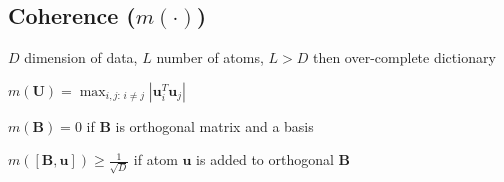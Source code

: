 \documentclass[a4paper, 11pt, landscape]{article}
\DeclareMathOperator*{\argmax}{arg\,max}
\begin{document}
\begin{multicols*}{3}


\section{Coherence ($m(\cdot)$)}
\begin{compactitem}
	\item $D$ dimension of data, $L$ number of atoms, $L > D$ then over-complete dictionary
	\item $m(\mathbf{U}) = \max_{i,j:\, i \neq j} | \mathbf{u}_i^T \mathbf{u}_j |$
	\item $m(\mathbf{B}) = 0$ if $\mathbf{B}$ is orthogonal matrix and a basis
	\item $m([\mathbf{B}, \mathbf{u}]) \geq \frac{1}{\sqrt{D}}$ if atom $\mathbf{u}$ is added to orthogonal $\mathbf{B}$
\end{compactitem}


\end{multicols*}
\end{document}
